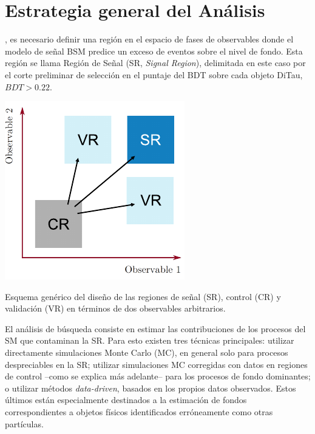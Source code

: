 \chapter{Estrategia general del Análisis} \label{chap:ch4}

, es necesario definir una región en el espacio de fases de observables donde el modelo de señal BSM predice un exceso de eventos sobre el nivel de fondo. Esta región se llama Región de Señal (SR, \textit{Signal Region}), delimitada en este caso por el corte preliminar de selección en el puntaje del BDT sobre cada objeto DiTau, $BDT > 0.22$.

\begin{marginfigure}[55pt]
    \includegraphics[width=0.99\linewidth]{Assets/Images/regions.pdf}
    \caption{Esquema genérico del diseño de las regiones de señal (SR), control (CR) y validación (VR) en términos de dos observables arbitrarios.}
    \label{fig:ch4:regions_generic}
\end{marginfigure}

El análisis de búsqueda consiste en estimar las contribuciones de los procesos del SM que contaminan la SR. Para esto existen tres técnicas principales: utilizar directamente simulaciones Monte Carlo (MC), en general solo para procesos despreciables en la SR; utilizar simulaciones MC corregidas con datos en regiones de control --como se explica más adelante-- para los procesos de fondo dominantes; o utilizar métodos \textit{data-driven}, basados en los propios datos observados. Estos últimos están especialmente destinados a la estimación de fondos correspondientes a objetos físicos identificados erróneamente como otras partículas.


